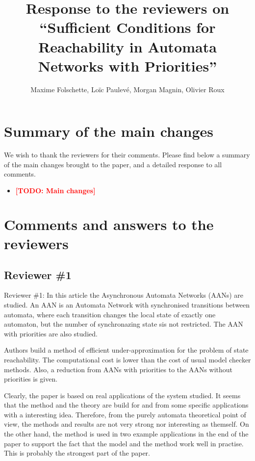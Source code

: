 \documentclass[11pt]{article}
\title{Response to the reviewers on “Sufficient Conditions for Reachability in Automata Networks with Priorities”}
\author{Maxime Folschette, Loïc Paulevé, Morgan Magnin, Olivier Roux}
\date{}
\newcommand{\todo}[1]{\textcolor{red}{\textbf{[TODO: #1]}}}
\begin{document}
\maketitle



\section*{Summary of the main changes}

We wish to thank the reviewers for their comments.
Please find below a summary of the main changes brought to the paper, and a detailed response to all comments.

\begin{itemize}
  \item \todo{Main changes}
\end{itemize}



\section*{Comments and answers to the reviewers}

\subsection*{Reviewer \#1}


Reviewer \#1: In this article the  Asynchronous Automata Networks (AANs) are studied. An AAN is an Automata Network with synchronised transitions between automata, where each transition changes the local state of exactly one automaton, but the number of synchronazing state sis not restricted.  The AAN with priorities are also studied. 

Authors build a method of efficient under-approximation for the problem of state reachability. The computational cost is lower than the cost of usual model checker methods. Also, a reduction from AANs with priorities to the AANs without priorities is given.

Clearly, the paper is based on real applications of the system studied. It seems that the method and the theory are build for and from some specific applications with a interesting idea. Therefore, from the purely automata theoretical point of view,  the methods and results are not very strong nor interesting as themself. On the other hand, the method is used in two example applications in the end of the paper to support the fact that the model and the method work well in practise. This is probably the strongest part of the paper.  
\end{document}
